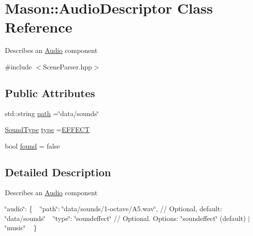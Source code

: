 \hypertarget{class_mason_1_1_audio_descriptor}{}\section{Mason\+:\+:Audio\+Descriptor Class Reference}
\label{class_mason_1_1_audio_descriptor}


Describes an \hyperlink{class_mason_1_1_audio}{Audio} component ~\newline
  




{\ttfamily \#include $<$Scene\+Parser.\+hpp$>$}

\subsection*{Public Attributes}
\begin{DoxyCompactItemize}
\item 
std\+::string \hyperlink{class_mason_1_1_audio_descriptor_a48908da92ad467deffccb4d8340aea20}{path} =\char`\"{}data/sounds\char`\"{}
\item 
\hyperlink{namespace_mason_a158d651086d1ba1aacc4c37125b27657}{Sound\+Type} \hyperlink{class_mason_1_1_audio_descriptor_af0235fd20741197930246f28acb5113b}{type} =\hyperlink{namespace_mason_a158d651086d1ba1aacc4c37125b27657a3ee843ce73fc06de504eb1480c65c82f}{E\+F\+F\+E\+CT}
\item 
bool \hyperlink{class_mason_1_1_audio_descriptor_ab49d1cfecfbd13d161f1bad522bd3294}{found} = false
\end{DoxyCompactItemize}


\subsection{Detailed Description}
Describes an \hyperlink{class_mason_1_1_audio}{Audio} component ~\newline
 

\char`\"{}audio\char`\"{}\+: \{ ~\newline
 \char`\"{}path\char`\"{}\+: \char`\"{}data/sounds/1-\/octave/\+A5.\+wav\char`\"{}, // Optional, default\+: \char`\"{}data/sounds\char`\"{} ~\newline
 \char`\"{}type\char`\"{}\+: \char`\"{}soundeffect\char`\"{} // Optional. Options\+: \char`\"{}soundeffect\char`\"{} (default) $\vert$ \char`\"{}music\char`\"{} ~\newline
 \} 

